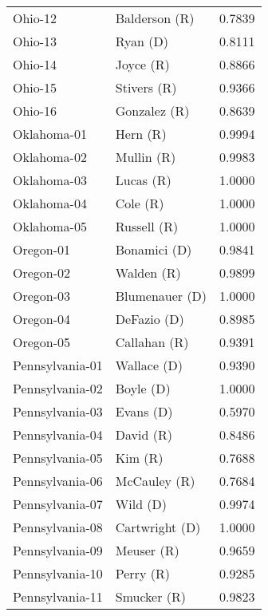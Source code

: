 \begin{longtable}{llr}
           Ohio-12 &        Balderson (R) &       0.7839 \\
           Ohio-13 &             Ryan (D) &       0.8111 \\
           Ohio-14 &            Joyce (R) &       0.8866 \\
           Ohio-15 &          Stivers (R) &       0.9366 \\
           Ohio-16 &         Gonzalez (R) &       0.8639 \\
       Oklahoma-01 &             Hern (R) &       0.9994 \\
       Oklahoma-02 &           Mullin (R) &       0.9983 \\
       Oklahoma-03 &            Lucas (R) &       1.0000 \\
       Oklahoma-04 &             Cole (R) &       1.0000 \\
       Oklahoma-05 &          Russell (R) &       1.0000 \\
         Oregon-01 &         Bonamici (D) &       0.9841 \\
         Oregon-02 &           Walden (R) &       0.9899 \\
         Oregon-03 &       Blumenauer (D) &       1.0000 \\
         Oregon-04 &          DeFazio (D) &       0.8985 \\
         Oregon-05 &         Callahan (R) &       0.9391 \\
   Pennsylvania-01 &          Wallace (D) &       0.9390 \\
   Pennsylvania-02 &            Boyle (D) &       1.0000 \\
   Pennsylvania-03 &            Evans (D) &       0.5970 \\
   Pennsylvania-04 &            David (R) &       0.8486 \\
   Pennsylvania-05 &              Kim (R) &       0.7688 \\
   Pennsylvania-06 &         McCauley (R) &       0.7684 \\
   Pennsylvania-07 &             Wild (D) &       0.9974 \\
   Pennsylvania-08 &       Cartwright (D) &       1.0000 \\
   Pennsylvania-09 &           Meuser (R) &       0.9659 \\
   Pennsylvania-10 &            Perry (R) &       0.9285 \\
   Pennsylvania-11 &          Smucker (R) &       0.9823 \\

\end{longtable}

